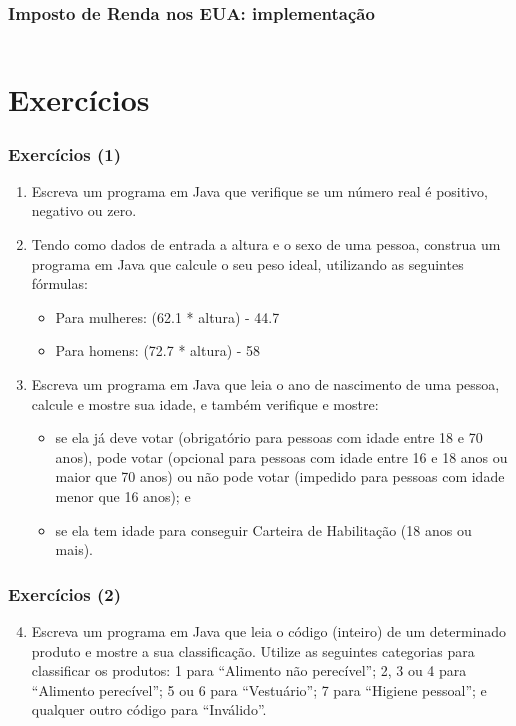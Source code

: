\documentclass[xcolor={dvipsnames,table},aspectratio=169]{beamer}
\begin{document}
\begin{frame}[fragile]\frametitle{Imposto de Renda nos EUA: implementação}
\tiny{\inputminted[bgcolor=cyan!10]{java}{src/ImpostoEUA.java}}		
\end{frame}

\section{Exercícios}

\begin{frame}\frametitle{Exercícios (1)}
\begin{enumerate}
	\item Escreva um programa em Java que verifique se um número real é positivo, negativo ou zero.
	\item Tendo como dados de entrada a altura e o sexo de uma pessoa, construa um programa em Java que calcule o seu peso ideal, utilizando as seguintes fórmulas:
	\begin{itemize}
		\item Para mulheres: (62.1 * altura) - 44.7
		\item Para homens: (72.7 * altura) - 58
	\end{itemize}
	\item Escreva um programa em Java que leia o ano de nascimento de uma pessoa, calcule e mostre sua idade, e também verifique e mostre:
	\begin{itemize}
		\item se ela já deve votar (obrigatório para pessoas com idade entre 18 e 70 anos), pode votar (opcional para pessoas com idade entre 16 e 18 anos ou maior que 70 anos) ou não pode votar (impedido para pessoas com idade menor que 16 anos); e
		\item se ela tem idade para conseguir Carteira de Habilitação (18 anos ou mais).
	\end{itemize}
\end{enumerate}
\end{frame}

\begin{frame}\frametitle{Exercícios (2)}
\begin{enumerate}
	\setcounter{enumi}{3}
	\item Escreva um programa em Java que leia o código (inteiro) de um determinado produto e mostre a sua classificação. Utilize as seguintes categorias para classificar os produtos: 1 para ``Alimento não perecível''; 2, 3 ou 4 para ``Alimento perecível''; 5 ou 6 para ``Vestuário''; 7 para ``Higiene pessoal''; e qualquer outro código para ``Inválido''.
\end{enumerate}
\end{frame}
\end{document}
